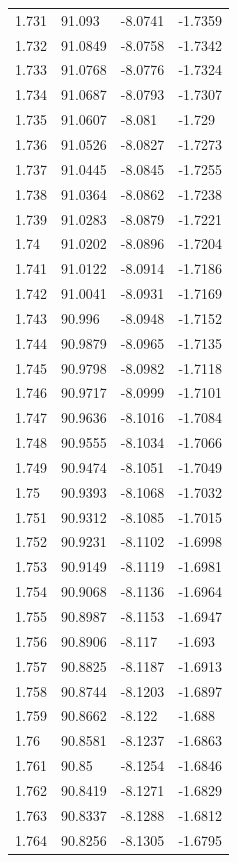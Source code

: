 \begin{tabular}{llll}
1.731 & 91.093 & -8.0741 & -1.7359 \\
1.732 & 91.0849 & -8.0758 & -1.7342 \\
1.733 & 91.0768 & -8.0776 & -1.7324 \\
1.734 & 91.0687 & -8.0793 & -1.7307 \\
1.735 & 91.0607 & -8.081 & -1.729 \\
1.736 & 91.0526 & -8.0827 & -1.7273 \\
1.737 & 91.0445 & -8.0845 & -1.7255 \\
1.738 & 91.0364 & -8.0862 & -1.7238 \\
1.739 & 91.0283 & -8.0879 & -1.7221 \\
1.74 & 91.0202 & -8.0896 & -1.7204 \\
1.741 & 91.0122 & -8.0914 & -1.7186 \\
1.742 & 91.0041 & -8.0931 & -1.7169 \\
1.743 & 90.996 & -8.0948 & -1.7152 \\
1.744 & 90.9879 & -8.0965 & -1.7135 \\
1.745 & 90.9798 & -8.0982 & -1.7118 \\
1.746 & 90.9717 & -8.0999 & -1.7101 \\
1.747 & 90.9636 & -8.1016 & -1.7084 \\
1.748 & 90.9555 & -8.1034 & -1.7066 \\
1.749 & 90.9474 & -8.1051 & -1.7049 \\
1.75 & 90.9393 & -8.1068 & -1.7032 \\
1.751 & 90.9312 & -8.1085 & -1.7015 \\
1.752 & 90.9231 & -8.1102 & -1.6998 \\
1.753 & 90.9149 & -8.1119 & -1.6981 \\
1.754 & 90.9068 & -8.1136 & -1.6964 \\
1.755 & 90.8987 & -8.1153 & -1.6947 \\
1.756 & 90.8906 & -8.117 & -1.693 \\
1.757 & 90.8825 & -8.1187 & -1.6913 \\
1.758 & 90.8744 & -8.1203 & -1.6897 \\
1.759 & 90.8662 & -8.122 & -1.688 \\
1.76 & 90.8581 & -8.1237 & -1.6863 \\
1.761 & 90.85 & -8.1254 & -1.6846 \\
1.762 & 90.8419 & -8.1271 & -1.6829 \\
1.763 & 90.8337 & -8.1288 & -1.6812 \\
1.764 & 90.8256 & -8.1305 & -1.6795 \\

\end{tabular}
